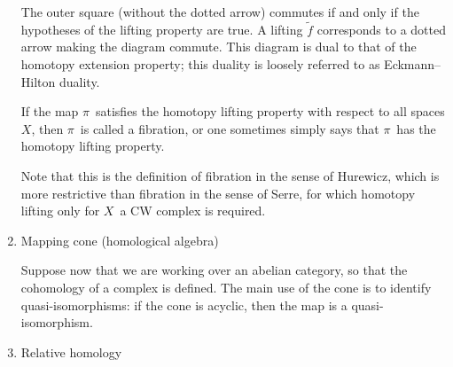 \documentclass{ctexart}
\begin{document}
\begin{enumerate}
The outer square (without the dotted arrow) commutes if and only if the hypotheses of the lifting property are true. A lifting ${\tilde {f}}$ corresponds to a dotted arrow making the diagram commute. This diagram is dual to that of the homotopy extension property; this duality is loosely referred to as Eckmann–Hilton duality.

If the map $\pi\,$ satisfies the homotopy lifting property with respect to all spaces $X$, then $\pi\,$ is called a fibration, or one sometimes simply says that $\pi\,$ has the homotopy lifting property.

Note that this is the definition of fibration in the sense of Hurewicz, which is more restrictive than fibration in the sense of Serre, for which homotopy lifting only for $X\,$ a CW complex is required.

\item Mapping cone (homological algebra)

Suppose now that we are working over an abelian category, so that the cohomology of a complex is defined. The main use of the cone is to identify quasi-isomorphisms: if the cone is acyclic, then the map is a quasi-isomorphism.

\item Relative homology


\end{enumerate}
\end{document}
